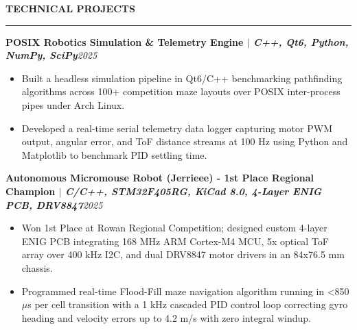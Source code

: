 \documentclass[10pt]{article}
\newcommand{\Section}[1]{%
  \vspace{4.0pt}%
  \textbf{\MakeUppercase{#1}}\par\vspace{-3.5pt}%
  \rule{\linewidth}{0.55pt}\par\vspace{2.5pt}%
}
\newcommand{\ProjectHeading}[2]{\noindent\textbf{#1}\hfill\textit{#2}\par}
\begin{document}
\vspace{2pt}
\Section{Technical Projects}
\ProjectHeading{POSIX Robotics Simulation \& Telemetry Engine $|$ \emph{C++, Qt6, Python, NumPy, SciPy}}{2025}
\begin{itemize}
  \item Built a headless simulation pipeline in Qt6/C++ benchmarking pathfinding algorithms across 100+ competition maze layouts over POSIX inter-process pipes under Arch Linux.
  \item Developed a real-time serial telemetry data logger capturing motor PWM output, angular error, and ToF distance streams at 100 Hz using Python and Matplotlib to benchmark PID settling time.
\end{itemize}
\vspace{2pt}
\ProjectHeading{Autonomous Micromouse Robot (Jerrieee) - 1st Place Regional Champion $|$ \emph{C/C++, STM32F405RG, KiCad 8.0, 4-Layer ENIG PCB, DRV8847}}{2025}
\begin{itemize}
  \item Won 1st Place at Rowan Regional Competition; designed custom 4-layer ENIG PCB integrating 168 MHz ARM Cortex-M4 MCU, 5x optical ToF array over 400 kHz I2C, and dual DRV8847 motor drivers in an 84x76.5 mm chassis.
  \item Programmed real-time Flood-Fill maze navigation algorithm running in <850 $\mu$s per cell transition with a 1 kHz cascaded PID control loop correcting gyro heading and velocity errors up to 4.2 m/s with zero integral windup.
\end{itemize}
\vspace{2pt}
\end{document}
